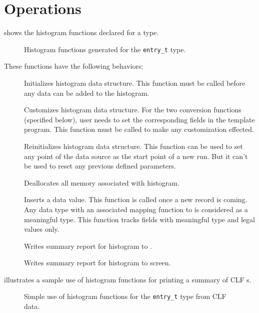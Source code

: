 \section{Operations}
 shows the histogram functions declared 
for a \pads{} type.
\begin{figure}
\caption{Histogram functions generated for the \texttt{entry\_t} type.}
\label{figure:histogram}
\end{figure}
%
These functions have the following behaviors:
\begin{description}
\item[] Initializes histogram data
  structure. This function must be called before any data can be added
  to the histogram.
\item[] Customizes histogram data
  structure. For the two conversion functions (specified below), user
  needs to set the corresponding fields in the template program. This
  function must be called to make any customization effected.  
\item[] Reinitializes histogram data
  structure. This function can be used to set any point of the data
  source as the start point of a new run. But it can't be used to 
  reset any previous defined parameters.
\item[] Deallocates all memory associated
  with histogram.
\item[] Inserts a data value. This function 
  is called once a new record is coming. Any data type with an
  associated mapping function to  is considered as a 
  meaningful type. This function tracks fields with meaningful type
  and legal values only.  
\item[] Writes summary report for
  histogram  to . 
\item[] Writes summary report for
  histogram  to screen. 
\end{description}
 illustrates a sample use of histogram
functions for printing a summary of CLF s.  
\begin{figure}
\caption{Simple use of histogram functions for the
  \texttt{entry\_t} type from CLF data.}
\label{figure:wsl-hist-hand}
\end{figure}

